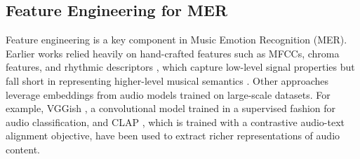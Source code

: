 
\subsection{Feature Engineering for MER}

Feature engineering is a key component in Music Emotion Recognition (MER). Earlier works relied heavily on hand-crafted features such as MFCCs, chroma features, and rhythmic descriptors \cite{hizlisoy2021music}, which capture low-level signal properties but fall short in representing higher-level musical semantics \cite{panda2018novel}. Other approaches leverage embeddings from audio models trained on large-scale datasets. For example, VGGish \cite{hershey2017cnn}, a convolutional model trained in a supervised fashion for audio classification, and CLAP \cite{elizalde2023clap}, which is trained with a contrastive audio-text alignment objective, have been used to extract richer representations of audio content.

